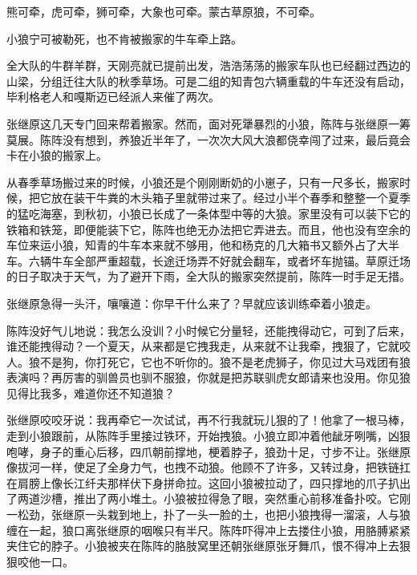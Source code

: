 
\par 熊可牵，虎可牵，狮可牵，大象也可牵。蒙古草原狼，不可牵。
\par 小狼宁可被勒死，也不肯被搬家的牛车牵上路。
\par 全大队的牛群羊群，天刚亮就已提前出发，浩浩荡荡的搬家车队也已经翻过西边的山梁，分组迁往大队的秋季草场。可是二组的知青包六辆重载的牛车还没有启动，毕利格老人和嘎斯迈已经派人来催了两次。
\par 张继原这几天专门回来帮着搬家。然而，面对死犟暴烈的小狼，陈阵与张继原一筹莫展。陈阵没有想到，养狼近半年了，一次次大风大浪都侥幸闯了过来，最后竟会卡在小狼的搬家上。
\par 从春季草场搬过来的时候，小狼还是个刚刚断奶的小崽子，只有一尺多长，搬家时候，把它放在装干牛粪的木头箱子里就带过来了。经过小半个春季和整整一个夏季的猛吃海塞，到秋初，小狼已长成了一条体型中等的大狼。家里没有可以装下它的铁箱和铁笼，即便能装下它，陈阵也绝无办法把它弄进去。而且，他也没有空余的车位来运小狼，知青的牛车本来就不够用，他和杨克的几大箱书又额外占了大半车。六辆牛车全部严重超载，长途迁场弄不好就会翻车，或者坏车抛锚。草原迁场的日子取决于天气，为了避开下雨，全大队的搬家突然提前，陈阵一时手足无措。
\par 张继原急得一头汗，嚷嚷道：你早干什么来了？早就应该训练牵着小狼走。
\par 陈阵没好气儿地说：我怎么没训？小时候它分量轻，还能拽得动它，可到了后来，谁还能拽得动？一个夏天，从来都是它拽我走，从来就不让我牵，拽狠了，它就咬人。狼不是狗，你打死它，它也不听你的。狼不是老虎狮子，你见过大马戏团有狼表演吗？再厉害的驯兽员也驯不服狼，你就是把苏联驯虎女郎请来也没用。你见狼见得比我多，难道你还不知道狼？
\par 张继原咬咬牙说：我再牵它一次试试，再不行我就玩儿狠的了！他拿了一根马棒，走到小狼跟前，从陈阵手里接过铁环，开始拽狼。小狼立即冲着他龇牙咧嘴，凶狠咆哮，身子的重心后移，四爪朝前撑地，梗着脖子，狼劲十足，寸步不让。张继原像拔河一样，使足了全身力气，也拽不动狼。他顾不了许多，又转过身，把铁链扛在肩膀上像长江纤夫那样伏下身拼命拉。这回小狼被拉动了，四只撑地的爪子扒出了两道沙槽，推出了两小堆土。小狼被拉得急了眼，突然重心前移准备扑咬。它刚一松劲，张继原一头栽到地上，扑了一头一脸的土，也把小狼拽得一溜滚，人与狼缠在一起，狼口离张继原的咽喉只有半尺。陈阵吓得冲上去搂住小狼，用胳膊紧紧夹住它的脖子。小狼被夹在陈阵的胳肢窝里还朝张继原张牙舞爪，恨不得冲上去狠狠咬他一口。

